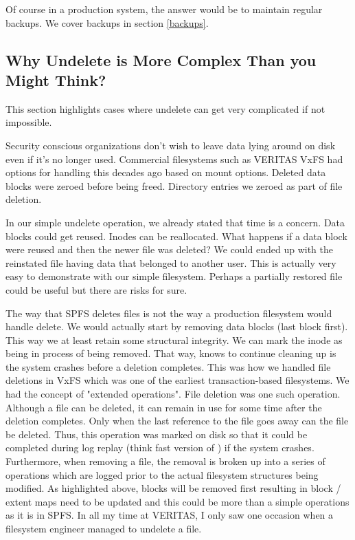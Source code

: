 \noindent
Of course in a production system, the answer would be to maintain regular backups. We cover backups in section \ref{backups}.


\subsection{Why Undelete is More Complex Than you Might Think?}

This section highlights cases where undelete can get very complicated if not impossible. 

Security conscious organizations don't wish to leave data lying around on disk even if it's no longer used. Commercial filesystems such as VERITAS VxFS had options for handling this decades ago based on mount options. Deleted data blocks were zeroed before being freed. Directory entries we zeroed as part of file deletion.

In our simple undelete operation, we already stated that time is a concern. Data blocks could get reused. Inodes can be reallocated. What happens if a data block were reused and then the newer file was deleted? We could ended up with the reinstated file having data that belonged to another user. This is actually very easy to demonstrate with our simple filesystem. Perhaps a partially restored file could be useful but there are risks for sure.

The way that SPFS deletes files is not the way a production filesystem would handle delete. We would actually start by removing data blocks (last block first). This way we at least retain some structural integrity. We can mark the inode as being in process of being removed. That way,  knows to continue cleaning up is the system crashes before a deletion completes. This was how we handled file deletions in VxFS which was one of the earliest transaction-based filesystems. We had the concept of "extended operations". File deletion was one such operation. Although a file can be deleted, it can remain in use for some time after the deletion completes. Only when the last reference to the file goes away can the file be deleted. Thus, this operation was marked on disk so that it could be completed during log replay (think fast version of ) if the system crashes. Furthermore, when removing a file, the removal is broken up into a series of operations which are logged prior to the actual filesystem structures being modified. As highlighted above, blocks will be removed first resulting in block / extent maps need to be updated and this could be more than a simple operations as it is in SPFS. In all my time at VERITAS, I only saw one occasion when a filesystem engineer managed to undelete a file.

